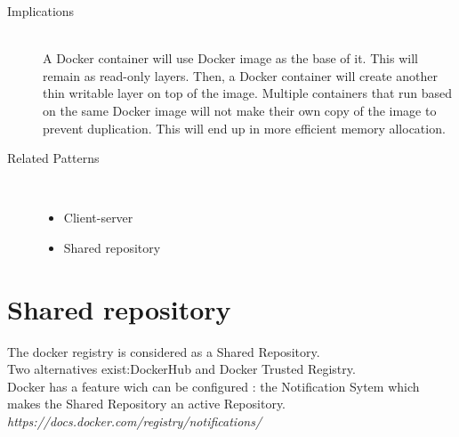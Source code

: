 \begin{description}
\item [Implications]~\\
A Docker container will use Docker image as the base of it. This will remain as
read-only layers. Then, a Docker container will create another thin writable
layer on top of the image. Multiple containers that run based on the same Docker
image will not make their own copy of the image to prevent duplication. This
will end up in more efficient memory allocation.

\item [Related Patterns]~\\
\begin{itemize}
	\item Client-server
	\item Shared repository
\end{itemize}
\end{description}



\section{Shared repository}

The docker registry is considered as a Shared Repository. \\
Two alternatives exist:DockerHub and Docker Trusted Registry. \\

Docker has a feature wich can be configured : the Notification Sytem which makes the Shared Repository an active Repository.
\textit{https://docs.docker.com/registry/notifications/}

